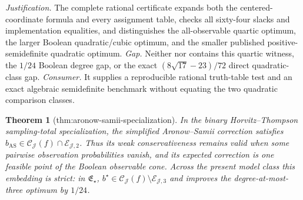 \documentclass{article}
\newtheorem{theorem}{Theorem}
\begin{document}
\par\smallskip\noindent \textit{Justification.} The complete rational certificate expands both the centered-coordinate formula and every assignment table, checks all sixty-four slacks and implementation equalities, and distinguishes the all-observable quartic optimum, the larger Boolean quadratic/cubic optimum, and the smaller published positive-semidefinite quadratic optimum. \textit{Gap.} Neither \cite{HarshawMiddletonSavje2026} nor \cite{Lu2019FactorialBinary} contains this quartic witness, the \(1/24\) Boolean degree gap, or the exact \((8\sqrt{17}-23)/72\) direct quadratic-class gap. \textit{Consumer.} It supplies a reproducible rational truth-table test and an exact algebraic semidefinite benchmark without equating the two quadratic comparison classes.

\begin{theorem}[thm:aronow-samii-specialization]\label{thm:aronow-samii-specialization}
In the binary Horvitz--Thompson sampling-total specialization, the simplified Aronow--Samii correction satisfies \(b_{\mathrm{AS}}\in\mathcal C_{\mathcal J}(f)\cap\mathcal E_{\mathcal J,2}\). Thus its weak conservativeness remains valid when some pairwise observation probabilities vanish, and its expected correction is one feasible point of the Boolean observable cone. Across the present model class this embedding is strict: in \(\mathfrak E_\star\), \(b^\star\in\mathcal C_{\mathcal J}(f)\setminus\mathcal E_{\mathcal J,3}\) and improves the degree-at-most-three optimum by \(1/24\).
\end{theorem}
\end{document}
